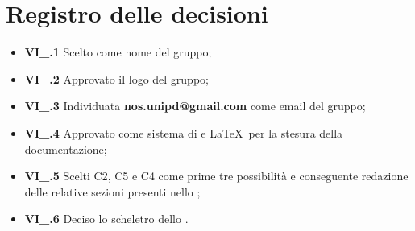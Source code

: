 \section{Registro delle decisioni}
\begin{itemize}
  \item \textbf{VI\_\Data.1} Scelto {\Gruppo} come nome del gruppo;
  \item \textbf{VI\_\Data.2} Approvato il logo del gruppo;
  \item \textbf{VI\_\Data.3} Individuata \textbf{nos.unipd@gmail.com} come email del gruppo;
  \item \textbf{VI\_\Data.4} Approvato  come sistema di  e \LaTeX\ per la stesura della documentazione;
  \item \textbf{VI\_\Data.5} Scelti  C2, C5 e C4 come prime tre possibilità e conseguente redazione delle relative sezioni presenti nello \SdF;
  \item \textbf{VI\_\Data.6} Deciso lo scheletro dello \SdF.
\end{itemize}
